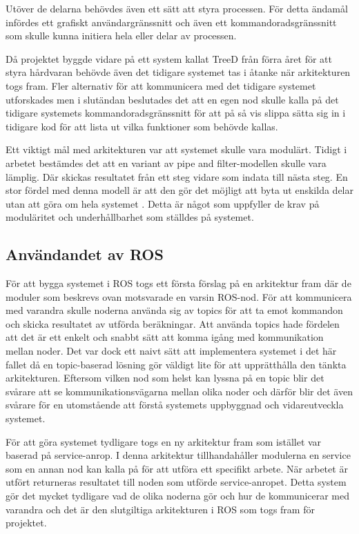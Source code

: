 Utöver de delarna behövdes även ett sätt att styra processen. För detta ändamål infördes ett grafiskt användargränssnitt och även ett kommandoradsgränssnitt som skulle kunna initiera hela eller delar av processen.

Då projektet byggde vidare på ett system kallat TreeD från förra året för att styra hårdvaran behövde även det tidigare systemet tas i åtanke när arkitekturen togs fram. Fler alternativ för att kommunicera med det tidigare systemet utforskades men i slutändan beslutades det att en egen nod skulle kalla på det tidigare systemets kommandoradsgränssnitt för att på så vis slippa sätta sig in i tidigare kod för att lista ut vilka funktioner som behövde kallas.

Ett viktigt mål med arkitekturen var att systemet skulle vara modulärt. Tidigt i arbetet bestämdes det att en variant av pipe and filter-modellen skulle vara lämplig. Där skickas resultatet från ett steg vidare som indata till nästa steg. En stor fördel med denna modell är att den gör det möjligt att byta ut enskilda delar utan att göra om hela systemet \cite{garlan1993introduction}. Detta är något som uppfyller de krav på moduläritet och underhållbarhet som ställdes på systemet.

\subsection{Användandet av ROS}
För att bygga systemet i ROS togs ett första förslag på en arkitektur fram där de moduler som beskrevs ovan motsvarade en varsin ROS-nod. För att kommunicera med varandra skulle noderna använda sig av topics för att ta emot kommandon och skicka resultatet av utförda beräkningar. Att använda topics hade fördelen att det är ett enkelt och snabbt sätt att komma igång med kommunikation mellan noder. Det var dock ett naivt sätt att implementera systemet i det här fallet då en topic-baserad lösning gör väldigt lite för att upprätthålla den tänkta arkitekturen. Eftersom vilken nod som helst kan lyssna på en topic blir det svårare att se kommunikationsvägarna mellan olika noder och därför blir det även svårare för en utomstående att förstå systemets uppbyggnad och vidareutveckla systemet.

För att göra systemet tydligare togs en ny arkitektur fram som istället var baserad på service-anrop. I denna arkitektur tillhandahåller modulerna en service som en annan nod kan kalla på för att utföra ett specifikt arbete. När arbetet är utfört returneras resultatet till noden som utförde service-anropet. Detta system gör det mycket tydligare vad de olika noderna gör och hur de kommunicerar med varandra och det är den slutgiltiga arkitekturen i ROS som togs fram för projektet.


